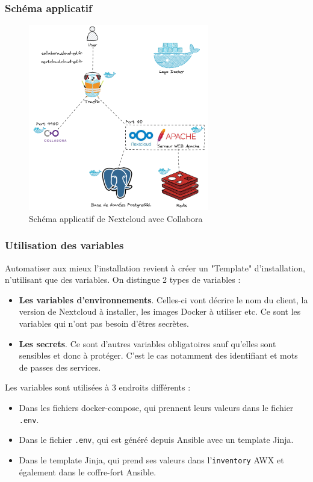 \documentclass[12pt]{article}
\begin{document}
\subsubsection{Schéma applicatif}
\begin{figure}[!ht]
    \centering
    \includegraphics[width=0.7\textwidth]{src/Nextcloud stack.png}
    \caption{Schéma applicatif de Nextcloud avec Collabora}
    \label{fig:nextcloudXcollabora}
\end{figure}

\subsubsection{Utilisation des variables}
Automatiser aux mieux l'installation revient à créer un "Template" d'installation, n'utilisant que des variables. 
On distingue 2 types de variables :
\begin{itemize}
    \item \textbf{Les variables d'environnements}. Celles-ci vont décrire le nom du client, la version de Nextcloud à installer, les images Docker à utiliser etc. 
    Ce sont les variables qui n'ont pas besoin d'êtres secrètes.
    \item \textbf{Les secrets}. Ce sont d'autres variables obligatoires sauf qu'elles sont sensibles et donc à protéger. 
    C'est le cas notamment des identifiant et mots de passes des services.
\end{itemize}

Les variables sont utilisées à 3 endroits différents :
\begin{itemize}
    \item Dans les fichiers docker-compose, qui prennent leurs valeurs dans le fichier \verb|.env|.
    \item Dans le fichier \verb|.env|, qui est généré depuis Ansible avec un template Jinja.
    \item Dans le template Jinja, qui prend ses valeurs dans l'\verb|inventory| AWX et également dans le coffre-fort Ansible.
\end{itemize}
\end{document}
